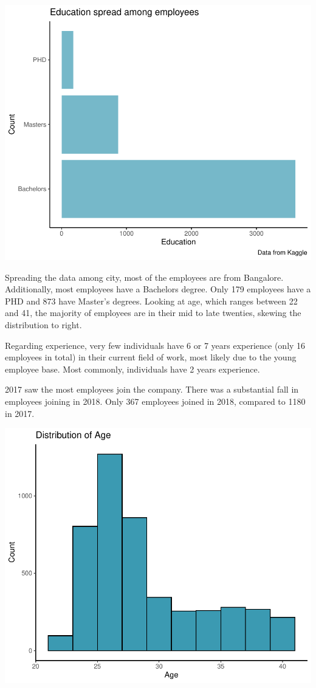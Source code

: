 \documentclass[11pt,preprint, authoryear]{elsarticle}
\numberwithin{equation}{section}
\numberwithin{figure}{section}
\numberwithin{table}{section}
\begin{document}
\includegraphics{Final_project_files/figure-latex/unnamed-chunk-3-1.pdf}

Spreading the data among city, most of the employees are from Bangalore.
Additionally, most employees have a Bachelors degree. Only 179 employees
have a PHD and 873 have Master's degrees. Looking at age, which ranges
between 22 and 41, the majority of employees are in their mid to late
twenties, skewing the distribution to right.

Regarding experience, very few individuals have 6 or 7 years experience
(only 16 employees in total) in their current field of work, most likely
due to the young employee base. Most commonly, individuals have 2 years
experience.

2017 saw the most employees join the company. There was a substantial
fall in employees joining in 2018. Only 367 employees joined in 2018,
compared to 1180 in 2017.

\includegraphics{Final_project_files/figure-latex/unnamed-chunk-4-1.pdf}
\end{document}
